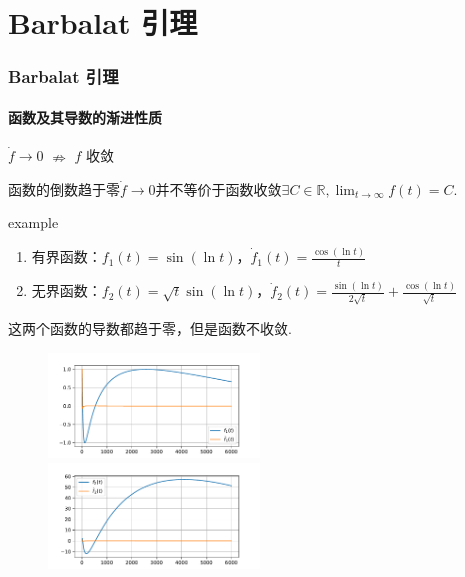 \section{Barbalat 引理}

\begin{frame}
  \frametitle{Barbalat 引理}
  \framesubtitle{函数及其导数的渐进性质}
  $\dot{f}\to 0 $
  $\nRightarrow$
  $f$ 收敛

  函数的倒数趋于零$\dot{f}\to 0 $并不等价于函数收敛$\exists C\in\mathbb{R},\lim_{t\to\infty}f(t)=C$.

  \begin{block}{example}
    \begin{enumerate}
      \item 有界函数：$f_1(t)=\sin(\ln t)$，$\dot{f}_1(t)=\frac{\cos(\ln t)}{t}$
      \item 无界函数：$f_2(t)=\sqrt{t} \sin(\ln t)$，$\dot{f}_2(t)=\frac{\sin(\ln t)}{2 \sqrt{t}}+ \frac{\cos (\ln t)}{\sqrt{t}}$
    \end{enumerate}

    这两个函数的导数都趋于零，但是函数不收敛.

    \begin{figure}
      \centering
      \includegraphics[height=2.8cm]{figure/sinlnt.pdf}
      \quad
      \includegraphics[height=2.8cm]{figure/sqrttsinlnt.pdf}
    \end{figure}
  \end{block}
\end{frame}

